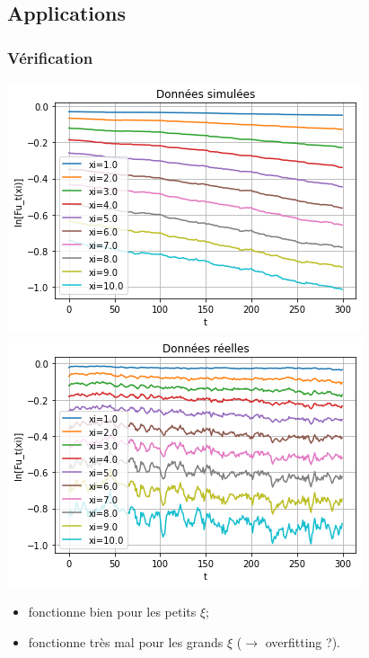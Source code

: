 \documentclass{beamer}
\begin{document}
\subsection{Applications}


\begin{frame}
\frametitle{Vérification}
\includegraphics[scale=0.4]{img/proj_non_norm_sim}
\includegraphics[scale=0.4]{img/proj_non_norm_rea}
\begin{itemize}[label=$\bullet$]
\item fonctionne bien pour les petits $\xi$;
\item fonctionne très mal pour les grands $\xi$ ($\to$ overfitting ?).
\end{itemize}


\end{frame}
\end{document}

